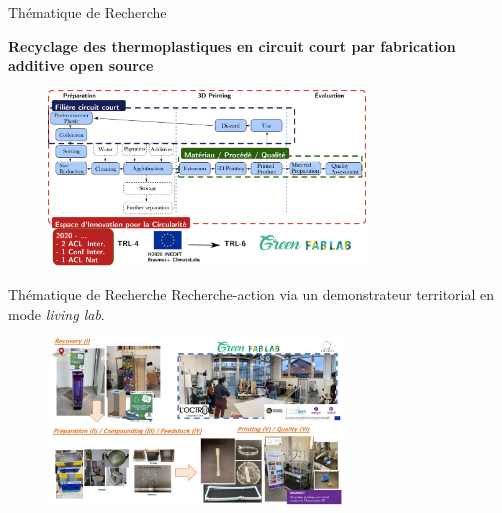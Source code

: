 \documentclass[
  11pt,
  ignorenonframetext,
  aspectratio=169,
  c]{beamer}
\begin{document}
\begin{frame}[t]{Thématique de Recherche}
\protect\hypertarget{thuxe9matique-de-recherche-4}{}
\small

\textbf{Recyclage des thermoplastiques en circuit court par fabrication
additive open source}

\begin{figure}

{\centering \includegraphics[width=0.75\textwidth,height=\textheight]{Figures/slides/DRAM-05.png}

}

\end{figure}
\end{frame}

\begin{frame}[t]{Thématique de Recherche}
\protect\hypertarget{thuxe9matique-de-recherche-5}{}
Recherche-action via un demonstrateur territorial en mode \emph{living
lab}.

\begin{figure}

{\centering \includegraphics[width=0.7\textwidth,height=\textheight]{Figures/INEDIT.jpg}

}

\end{figure}
\end{frame}
\end{document}
